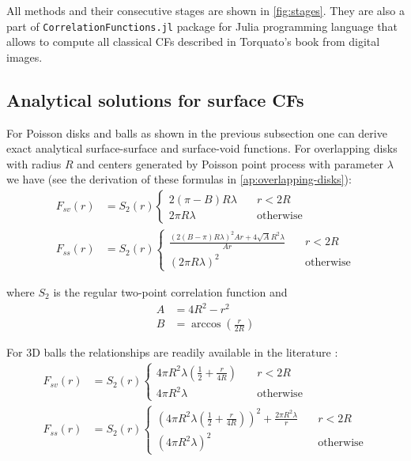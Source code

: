 \documentclass[reprint,amsmath,amssymb,aps,pre]{revtex4-1}
\newcommand{\code}[1]{\colorbox{light-gray}{\texttt{#1}}}
\begin{document}
All methods and their consecutive stages are shown in \cref{fig:stages}. They
are also a part of \code{CorrelationFunctions.jl} package \cite{ourpapaer} for
Julia programming language that allows to compute all classical CFs described in
Torquato’s book \cite{Torq_book} from digital images.

\subsection{Analytical solutions for surface CFs}
For Poisson disks and balls as shown in the previous subsection one can derive
exact analytical surface-surface and surface-void functions. For overlapping
disks with radius $R$ and centers generated by Poisson point process with
parameter $\lambda$ we have (see the derivation of these formulas in
\cref{ap:overlapping-disks}):
\begin{align}
  F_{sv}(r) &= S_2(r) \left\{
  \begin{array}{ll}
    2(\pi - B)R \lambda & \quad r<2R \\
    2\pi R \lambda & \quad \text{otherwise}
  \end{array} \right. \label{eq:fsv_final} \\
  F_{ss}(r) &= S_2(r) \left\{
  \begin{array}{ll}
    \frac{(2(B-\pi)R\lambda)^2Ar + 4\sqrt{A}R^2\lambda}{Ar} & \quad r<2R \\
    (2\pi R\lambda)^2 & \quad \text{otherwise}
  \end{array} \right. \label{eq:fss_final}
\end{align}

where $S_2$ is the regular two-point correlation function and
\begin{align*}
  A &= 4R^2 - r^2 \\
  B &= \arccos(\frac{r}{2R})
\end{align*}

For 3D balls the relationships are readily available in the literature
\cite{Torq_book}\cite{Ma_Torq}:
\begin{align*}
  F_{sv}(r) &= S_2(r) \left\{
  \begin{array}{ll}
    4\pi R^2\lambda(\frac{1}{2} + \frac{r}{4R}) & \quad r<2R \\
    4\pi R^2\lambda & \quad \text{otherwise}
  \end{array} \right. \\
  F_{ss}(r) &= S_2(r) \left\{
  \begin{array}{ll}
    {(4\pi R^2 \lambda (\frac{1}{2} + \frac{r}{4R}))^2 + \frac{2\pi R^2 \lambda}{r}} & \quad r<2R \\
    (4\pi R^2 \lambda)^2 & \quad \text{otherwise}
  \end{array} \right.
\end{align*}
\end{document}
